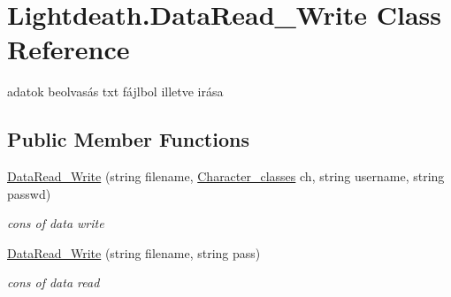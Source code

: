 \hypertarget{class_lightdeath_1_1_data_read___write}{}\section{Lightdeath.\+Data\+Read\+\_\+\+Write Class Reference}
\label{class_lightdeath_1_1_data_read___write}


adatok beolvasás txt fájlbol illetve irása  


\subsection*{Public Member Functions}
\begin{DoxyCompactItemize}
\item 
\hyperlink{class_lightdeath_1_1_data_read___write_a6d6d68f8dcfb2d23d6f21942b5b4321d}{Data\+Read\+\_\+\+Write} (string filename, \hyperlink{class_lightdeath_1_1_character__classes}{Character\+\_\+classes} ch, string username, string passwd)
\begin{DoxyCompactList}\small\item\em cons of data write \end{DoxyCompactList}\item 
\hyperlink{class_lightdeath_1_1_data_read___write_af94d127f5fdf05fa9e5555e6a84d95d7}{Data\+Read\+\_\+\+Write} (string filename, string pass)
\begin{DoxyCompactList}\small\item\em cons of data read \end{DoxyCompactList}\end{DoxyCompactItemize}

